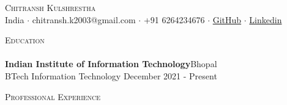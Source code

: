 \documentclass[a4paper]{article}
\newcommand{\lineunder} {
    \vspace*{-8pt} \\
    \hspace*{-18pt} \hrulefill \\
}
\newcommand{\header} [1] {
    {\hspace*{-18pt}\vspace*{6pt} \textsc{#1}}
    \vspace*{-6pt} \lineunder
}
\begin{document}
\vspace*{-40pt}

    

\vspace*{-9pt}
\begin{center}
	{\Huge \scshape {Chitransh Kulshrestha}}\\
	\vspace{2mm}
	India $\cdot$ chitransh.k2003@gmail.com $\cdot$ +91 6264234676 $\cdot$ \href{https://github.com/chitranshk1301}{GitHub} $\cdot$ \href{https://www.linkedin.com/in/chitransh-kulshrestha-00158a204//}{Linkedin} \\
\end{center}
\vspace{-1mm}
\header{Education}
\vspace{0mm}
\textbf{Indian Institute of Information Technology}\hfill Bhopal\\
BTech Information Technology \hfill December 2021 - Present\\
\vspace{1mm}
        
    
    
\header{Professional Experience}
\end{document}
